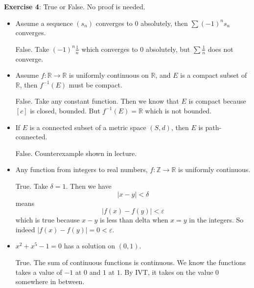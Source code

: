 \documentclass{article}
\begin{document}
\textbf{Exercise 4}: True or False. No proof is needed.
    \begin{itemize}
        \item Assume a sequence $(s_{n})$ converges to $0$ absolutely, then $\sum (-1)^{n}s_{n}$ converges.
            \begin{answer}
                False. Take $(-1)^{n}\frac{1}{n}$ which converges to $0$ absolutely, but $\sum\frac{1}{n}$ does not converge.
            \end{answer}

        \item Assume $f : \mathbb{R} \rightarrow \mathbb{R}$ is uniformly continuous on $\mathbb{R}$, and $E$ is a compact subset of $\mathbb{R}$, then $f^{-1}(E)$ must be compact.
            \begin{answer}
                False. Take any constant function. Then we know that $E$ is compact because $[c]$ is closed, bounded. But $f^{-1}(E) = \mathbb{R}$ which is not bounded.
            \end{answer}

        \item If $E$ is a connected subset of a metric space $(S, d)$, then $E$ is path-connected.
            \begin{answer}
                False. Counterexample shown in lecture.
            \end{answer}

        \item Any function from integers to real numbers, $f : \mathbb{Z} \rightarrow \mathbb{R}$ is uniformly continuous.
            \begin{answer}
                True. Take $\delta = 1$. Then we have
                    \begin{equation*}
                        \lvert x - y \rvert < \delta
                    \end{equation*}
                means
                    \begin{equation*}
                        \lvert f(x) - f(y) \rvert < \varepsilon
                    \end{equation*}
                which is true because $x - y$ is less than delta when $x = y$ in the integers. So indeed $\lvert f(x) - f(y) \rvert = 0 < \varepsilon$.
            \end{answer}

        \item $x^{2} + x^{5} - 1 = 0$ has a solution on $(0, 1)$. 
            \begin{answer}
                True. The sum of continuous functions is continuous. We know the functions takes a value of $-1$ at $0$ and $1$ at $1$. By IVT, it takes on the value $0$ somewhere in between.
            \end{answer}
    \end{itemize}
\end{document}
